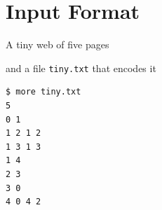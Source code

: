\documentclass[8pt,a4paper,compress]{beamer}
\begin{document}
\section{Input Format}
\begin{frame}[fragile]
\pause

A tiny web of five pages

\begin{center}
\end{center}

\pause
\bigskip

and a file \lstinline{tiny.txt} that encodes it
 
\begin{lstlisting}[language={}]
$ more tiny.txt
5
0 1
1 2 1 2
1 3 1 3
1 4
2 3
3 0
4 0 4 2
\end{lstlisting}
\end{frame}
\end{document}
